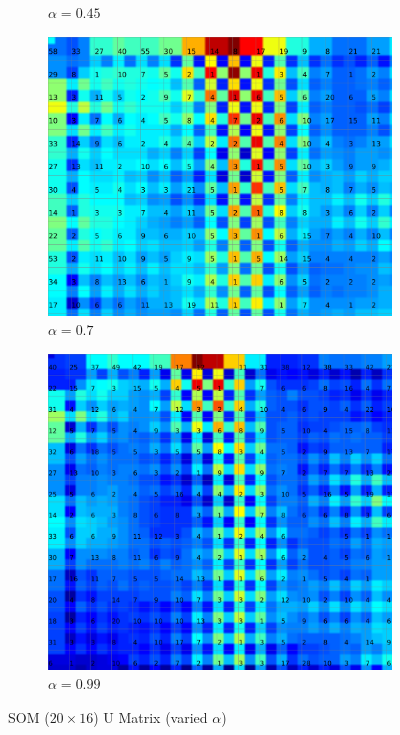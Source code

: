 \documentclass{acm_proc_article-sp}
\begin{document}
\begin{figure}
\begin{subfigure}[b]{0.24\linewidth}
        \caption{$\alpha=0.45$}
        \label{fig:wine-20x16-u-matrix-alpha-0.45}
    \end{subfigure}
    \begin{subfigure}[b]{0.24\linewidth}
        \includegraphics[width=\linewidth]{img/wine-20x16-u-matrix-alpha-0.7}
        \caption{$\alpha=0.7$}
        \label{fig:wine-20x16-u-matrix-alpha-0.7}
    \end{subfigure}
    \begin{subfigure}[b]{0.24\linewidth}
        \includegraphics[width=\linewidth]{img/wine-20x16-u-matrix-alpha-0.99}
        \caption{$\alpha=0.99$}
        \label{fig:wine-20x16-u-matrix-alpha-0.99}
    \end{subfigure}
    \caption{SOM ($20\times16$) U Matrix (varied $\alpha$)}
    \label{fig:wine-20x16-u-matrix-alpha}
\end{figure}
\end{document}
